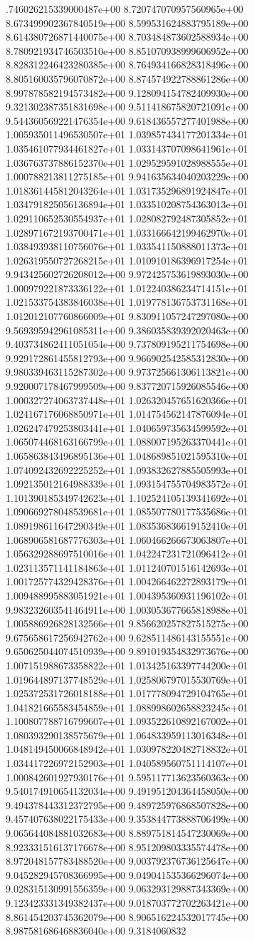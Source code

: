 .746026215339000487e+00	8.720747070957560965e+00	8.673499902367840519e+00	8.599531624883795189e+00	8.614380726871440075e+00	8.703484873602588934e+00	8.780921934746503510e+00	8.851070938999606952e+00	8.828312246423280385e+00	8.764934166828318496e+00	8.805160035796070872e+00	8.874574922788861286e+00	8.997878582194573482e+00	9.128094154782409930e+00	9.321302387351831698e+00	9.511418675820721091e+00	9.544360569221476354e+00	9.618436557277401988e+00	1.005935011496530507e+01	1.039857434177201334e+01	1.035461077934461827e+01	1.033143707098641961e+01	1.036763737886152370e+01	1.029529591028988555e+01	1.000788213811275185e+01	9.941635634040203229e+00	1.018361445812043264e+01	1.031735296891924847e+01	1.034791825056136894e+01	1.033510208754363013e+01	1.029110652530554937e+01	1.028082792487305852e+01	1.028971672193700471e+01	1.033166642199462970e+01	1.038493938110756076e+01	1.033541150888011373e+01	1.026319550727268215e+01	1.010910186396917254e+01	9.943425602726208012e+00	9.972425753619893030e+00	1.000979221873336122e+01	1.012240386234714151e+01	1.021533754383846038e+01	1.019778136753731168e+01	1.012012107760866009e+01	9.830911057247297080e+00	9.569395942961085311e+00	9.386035839392020463e+00	9.403734862411051054e+00	9.737809195211754698e+00	9.929172861455812793e+00	9.966902542585312830e+00	9.980339463115287302e+00	9.973725661306113821e+00	9.920007178467999509e+00	9.837720715926085546e+00	1.000327274063737448e+01	1.026320457651620366e+01	1.024167176068850971e+01	1.014754562147876094e+01	1.026247479253803441e+01	1.040659735634599592e+01	1.065074468163166799e+01	1.088007195263370441e+01	1.065863843496895136e+01	1.048689851021595310e+01	1.074092432692225252e+01	1.093832627885505993e+01	1.092135012164988339e+01	1.093154755704983572e+01	1.101390185349742623e+01	1.102524105139341692e+01	1.090669278048539681e+01	1.085507780177535686e+01	1.089198611647290349e+01	1.083536836619152410e+01	1.068906581687776303e+01	1.060466266673063807e+01	1.056329288697510016e+01	1.042247231721096412e+01	1.023113571141184863e+01	1.011240701516142693e+01	1.001725774329428376e+01	1.004266462272893179e+01	1.009488995883051921e+01	1.004395360931196102e+01	9.983232603541464911e+00	1.003053677665818988e+01	1.005886926828132566e+01	9.856620257827515275e+00	9.675658617256942762e+00	9.628511486143155551e+00	9.650625044074510939e+00	9.891019354832973676e+00	1.007151988673358822e+01	1.013425163397744200e+01	1.019644897137748529e+01	1.025806797015530769e+01	1.025372531726018188e+01	1.017778094729104765e+01	1.041821665583454859e+01	1.088998602658823245e+01	1.100807788716799607e+01	1.093522610892167002e+01	1.080393290138575679e+01	1.064833959113016348e+01	1.048149450066848942e+01	1.030978220482718832e+01	1.034417226972152903e+01	1.040589560751114107e+01	1.000842601927930176e+01	9.595117713623560363e+00	9.540174910654132034e+00	9.491951204364458050e+00	9.494378443312372795e+00	9.489725976868507828e+00	9.457407638022175433e+00	9.353844773888706499e+00	9.065644084881032683e+00	8.889751814547230069e+00	8.923331516137176678e+00	8.951209803335574478e+00	8.972048157783488520e+00	9.003792376736125647e+00	9.045282945708366995e+00	9.049041535366296074e+00	9.028315130991556359e+00	9.063293129887343369e+00	9.123423331349382437e+00	9.018703772702263421e+00	8.861454203745362079e+00	8.906516224532017745e+00	8.987581686468836040e+00	9.3184060832